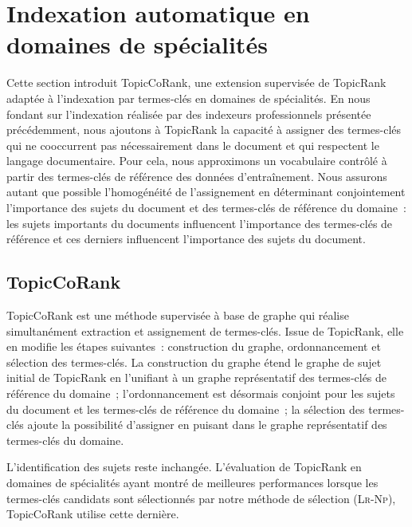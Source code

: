 
  \section{Indexation automatique en domaines de spécialités}
  \label{sec:main-domain_specific_keyphrase_annotation-supervised_automatic_keyphrase_extraction}
    Cette section introduit TopicCoRank, une extension supervisée de TopicRank
    adaptée à l'indexation par termes-clés en domaines de spécialités. En nous
    fondant sur l'indexation réalisée par des indexeurs professionnels présentée
    précédemment, nous ajoutons à TopicRank la capacité à assigner des
    termes-clés qui ne cooccurrent pas nécessairement dans le document et qui
    respectent le langage documentaire. Pour cela, nous approximons un
    vocabulaire contrôlé à partir des termes-clés de référence des données
    d'entraînement. Nous assurons autant que possible l'homogénéité de
    l'assignement en déterminant conjointement l'importance des sujets du
    document et des termes-clés de référence du domaine~: les sujets importants
    du documents influencent l'importance des termes-clés de référence et ces
    derniers influencent l'importance des sujets du document.

    \subsection{TopicCoRank}
    \label{subsec:main-domain_specific_keyphrase_annotation-supervised_automatic_keyphrase_annotation-topiccorank}
      TopicCoRank est une méthode supervisée à base de graphe qui réalise
      simultanément extraction et assignement de termes-clés. Issue de
      TopicRank, elle en modifie les étapes suivantes~: construction du graphe,
      ordonnancement et sélection des termes-clés. La construction du graphe
      étend le graphe de sujet initial de TopicRank en l'unifiant à un graphe
      représentatif des termes-clés de référence du domaine~; l'ordonnancement
      est désormais conjoint pour les sujets du document et les termes-clés de
      référence du domaine~; la sélection des termes-clés ajoute la possibilité
      d'assigner en puisant dans le graphe représentatif des termes-clés du
      domaine.
      
      L'identification des sujets reste inchangée. L'évaluation de TopicRank en
      domaines de spécialités ayant montré de meilleures performances lorsque
      les termes-clés candidats sont sélectionnés par notre méthode de sélection
      (\textsc{Lr-Np}), TopicCoRank utilise cette dernière.


